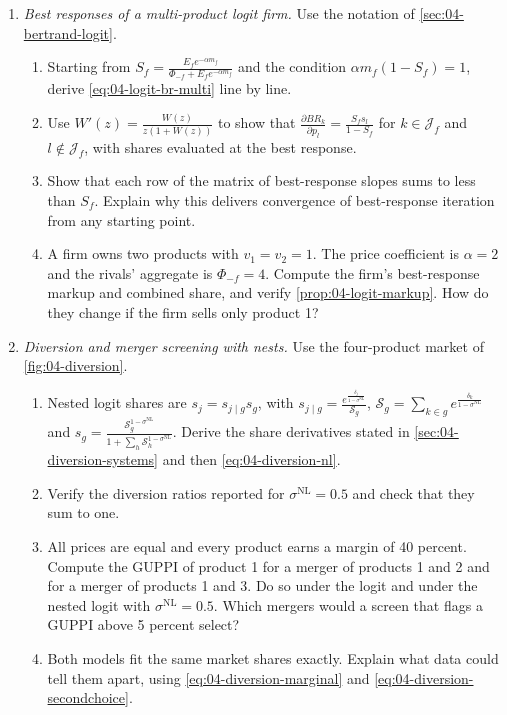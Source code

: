 \begin{enumerate}[label=\arabic*., leftmargin=*, itemsep=6pt]
\item \textit{Best responses of a multi-product logit firm.} Use the notation of \cref{sec:04-bertrand-logit}.
\begin{enumerate}[label=(\alph*)]
  \item Starting from $S_f = \frac{E_fe^{-\alpha m_f}}{\Phi_{-f} + E_fe^{-\alpha m_f}}$ and the condition
  $\alpha m_f(1 - S_f) = 1$, derive \eqref{eq:04-logit-br-multi} line by line.
  \item Use $W'(z) = \frac{W(z)}{z(1 + W(z))}$ to show that $\frac{\partial BR_k}{\partial p_l} = \frac{S_fs_l}{1 - S_f}$
  for $k \in \mathcal{J}_f$ and $l \notin \mathcal{J}_f$, with shares evaluated at the best response.
  \item Show that each row of the matrix of best-response slopes sums to less than $S_f$. Explain why this
  delivers convergence of best-response iteration from any starting point.
  \item A firm owns two products with $v_1 = v_2 = 1$. The price coefficient is $\alpha = 2$ and the rivals'
  aggregate is $\Phi_{-f} = 4$. Compute the firm's best-response markup and combined share, and verify
  \cref{prop:04-logit-markup}. How do they change if the firm sells only product 1?
\end{enumerate}

\item \textit{Diversion and merger screening with nests.} Use the four-product market of \cref{fig:04-diversion}.
\begin{enumerate}[label=(\alph*)]
  \item Nested logit shares are $s_j = s_{j\mid g}s_g$, with $s_{j\mid g} = \frac{e^{\frac{\delta_j}{1 - \sigma^{\mathrm{NL}}}}}{\mathcal{S}_g}$,
  $\mathcal{S}_g = \sum_{k \in g}e^{\frac{\delta_k}{1 - \sigma^{\mathrm{NL}}}}$ and
  $s_g = \frac{\mathcal{S}_g^{1 - \sigma^{\mathrm{NL}}}}{1 + \sum_h\mathcal{S}_h^{1 - \sigma^{\mathrm{NL}}}}$. Derive the
  share derivatives stated in \cref{sec:04-diversion-systems} and then \eqref{eq:04-diversion-nl}.
  \item Verify the diversion ratios reported for $\sigma^{\mathrm{NL}} = 0.5$ and check that they sum to one.
  \item All prices are equal and every product earns a margin of 40 percent. Compute the GUPPI of product 1 for a
  merger of products 1 and 2 and for a merger of products 1 and 3. Do so under the logit and under the nested logit
  with $\sigma^{\mathrm{NL}} = 0.5$. Which mergers would a screen that flags a GUPPI above 5 percent select?
  \item Both models fit the same market shares exactly. Explain what data could tell them apart, using
  \eqref{eq:04-diversion-marginal} and \eqref{eq:04-diversion-secondchoice}.
\end{enumerate}


\end{enumerate}
